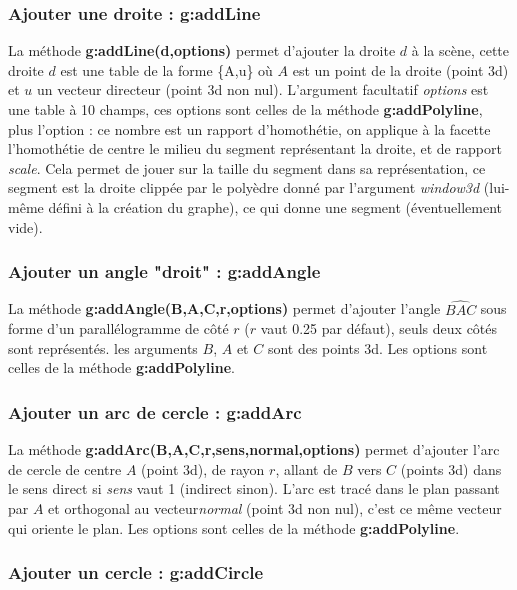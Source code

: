 \subsubsection{Ajouter une droite : g:addLine}

La méthode \textbf{g:addLine(d,options)} permet d'ajouter la droite $d$ à la scène, cette droite $d$ est une table de la forme \{A,u\} où $A$ est un point de la droite (point 3d) et $u$ un vecteur directeur (point 3d non nul).  L'argument facultatif \emph{options} est une table à 10 champs, ces options sont celles de la méthode \textbf{g:addPolyline}, plus l'option  : ce nombre est un rapport d'homothétie, on applique à la facette l'homothétie de centre le milieu du segment représentant la droite, et de rapport \emph{scale}. Cela permet de jouer sur la taille du segment dans sa représentation, ce segment est la droite clippée par le polyèdre donné par l'argument \emph{window3d} (lui-même défini à la création du graphe), ce qui donne une segment (éventuellement vide).

\subsubsection{Ajouter un angle "droit" : g:addAngle}

La méthode \textbf{g:addAngle(B,A,C,r,options)} permet d'ajouter l'angle $\widehat{BAC}$ sous forme d'un parallélogramme de côté $r$ ($r$ vaut 0.25 par défaut), seuls deux côtés sont représentés. les arguments $B$, $A$ et $C$ sont des points 3d. Les options sont celles de la méthode \textbf{g:addPolyline}.

\subsubsection{Ajouter un arc de cercle : g:addArc}

La méthode \textbf{g:addArc(B,A,C,r,sens,normal,options)} permet d'ajouter l'arc de cercle de centre $A$ (point 3d), de rayon $r$, allant de $B$ vers $C$ (points 3d) dans le sens direct si \emph{sens} vaut 1 (indirect sinon). L'arc est tracé dans le plan passant par $A$ et orthogonal au vecteur\emph{normal} (point 3d non nul), c'est ce même vecteur qui oriente le plan. Les options sont celles de la méthode \textbf{g:addPolyline}.

\subsubsection{Ajouter un cercle : g:addCircle}

